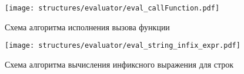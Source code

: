\clearpage

\begin{figure}[!htp]
	\centering
	\texttt{[image: structures/evaluator/eval\_callFunction.pdf]}
	\caption{Схема алгоритма исполнения вызова функции}
	\label{f:eval_callFunction}
\end{figure}

\clearpage

\begin{figure}[!htp]
	\centering
	\texttt{[image: structures/evaluator/eval\_string\_infix\_expr.pdf]}
	\caption{Схема алгоритма вычисления инфиксного выражения для строк}
	\label{f:eval_string_infix_expr}
\end{figure}